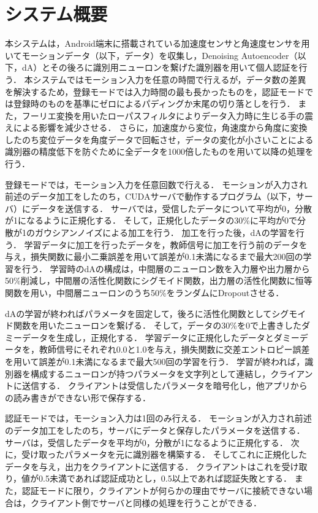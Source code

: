 \section{システム概要}
本システムは，Android端末に搭載されている加速度センサと角速度センサを用いてモーションデータ（以下，データ）を収集し，Denoising Autoencoder（以下，dA）とその後ろに識別用ニューロンを繋げた識別器を用いて個人認証を行う．
本システムではモーション入力を任意の時間で行えるが，データ数の差異を解決するため，登録モードでは入力時間の最も長かったものを，認証モードでは登録時のものを基準にゼロによるパディングか末尾の切り落としを行う．
また，フーリエ変換を用いたローパスフィルタによりデータ入力時に生じる手の震えによる影響を減少させる．
さらに，加速度から変位，角速度から角度に変換したのち変位データを角度データで回転させ，データの変化が小さいことによる識別器の精度低下を防ぐために全データを1000倍したものを用いて以降の処理を行う．

登録モードでは，モーション入力を任意回数で行える．
モーションが入力され前述のデータ加工をしたのち，CUDAサーバで動作するプログラム（以下，サーバ）にデータを送信する．
サーバでは，受信したデータについて平均が0，分散が1になるように正規化する．
そして，正規化したデータの30\%に平均が0で分散が1のガウシアンノイズによる加工を行う．
加工を行った後，dAの学習を行う．
学習データに加工を行ったデータを，教師信号に加工を行う前のデータを与え，損失関数に最小二乗誤差を用いて誤差が0.1未満になるまで最大200回の学習を行う．
学習時のdAの構成は，中間層のニューロン数を入力層や出力層から50\%削減し，中間層の活性化関数にシグモイド関数，出力層の活性化関数に恒等関数を用い，中間層ニューロンのうち50\%をランダムにDropoutさせる．

dAの学習が終わればパラメータを固定して，後ろに活性化関数としてシグモイド関数を用いたニューロンを繋げる．
そして，データの30\%を0で上書きしたダミーデータを生成し，正規化する．
学習データに正規化したデータとダミーデータを，教師信号にそれぞれ0.0と1.0を与え，損失関数に交差エントロピー誤差を用いて誤差が0.1未満になるまで最大500回の学習を行う．
学習が終われば，識別器を構成するニューロンが持つパラメータを文字列として連結し，クライアントに送信する．
クライアントは受信したパラメータを暗号化し，他アプリからの読み書きができない形で保存する．

認証モードでは，モーション入力は1回のみ行える．
モーションが入力され前述のデータ加工をしたのち，サーバにデータと保存したパラメータを送信する．
サーバは，受信したデータを平均が0，分散が1になるように正規化する．
次に，受け取ったパラメータを元に識別器を構築する．
そしてこれに正規化したデータを与え，出力をクライアントに送信する．
クライアントはこれを受け取り，値が0.5未満であれば認証成功とし，0.5以上であれば認証失敗とする．
また，認証モードに限り，クライアントが何らかの理由でサーバに接続できない場合は，クライアント側でサーバと同様の処理を行うことができる．
